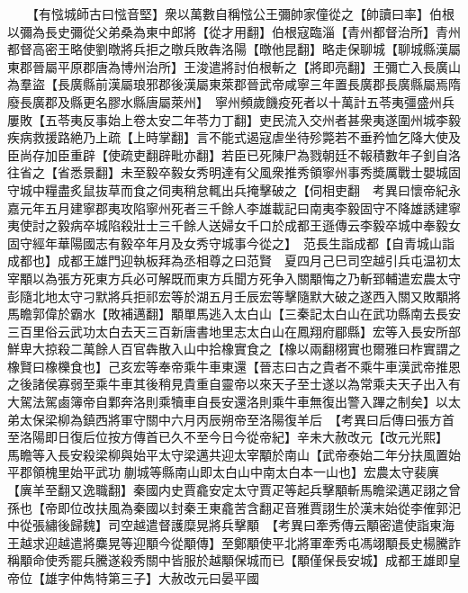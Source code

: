 　　【有惤城師古曰惤音堅】衆以萬數自稱惤公王彌帥家僮從之【帥讀曰率】伯根以彌為長史彌從父弟桑為東中郎將【從才用翻】伯根寇臨淄【青州都督治所】青州都督高密王略使劉暾將兵拒之暾兵敗犇洛陽【暾他昆翻】略走保聊城【聊城縣漢屬東郡晉屬平原郡唐為博州治所】王浚遣將討伯根斬之【將即亮翻】王彌亡入長廣山為羣盜【長廣縣前漢屬琅邪郡後漢屬東萊郡晉武帝咸寧三年置長廣郡長廣縣屬焉隋廢長廣郡及縣更名膠水縣唐屬萊州】　寧州頻歲饑疫死者以十萬計五苓夷彊盛州兵屢敗【五苓夷反事始上卷太安二年苓力丁翻】吏民流入交州者甚衆夷遂圍州城李毅疾病救援路絶乃上疏【上時掌翻】言不能式遏寇虐坐待殄斃若不垂矜恤乞降大使及臣尚存加臣重辟【使疏吏翻辟毗亦翻】若臣已死陳尸為戮朝廷不報積數年子釗自洛往省之【省悉景翻】未至毅卒毅女秀明達有父風衆推秀領寧州事秀奬厲戰士嬰城固守城中糧盡炙鼠抜草而食之伺夷稍怠輒出兵掩擊破之【伺相吏翻　考異曰懷帝紀永嘉元年五月建寧郡夷攻陷寧州死者三千餘人李雄載記曰南夷李毅固守不降雄誘建寧夷使討之毅病卒城陷殺壯士三千餘人送婦女千口於成都王遜傳云李毅卒城中奉毅女固守經年華陽國志有毅卒年月及女秀守城事今從之】　范長生詣成都【自青城山詣成都也】成都王雄門迎執板拜為丞相尊之曰范賢　夏四月己巳司空越引兵屯温初太宰顒以為張方死東方兵必可解既而東方兵聞方死争入關顒悔之乃斬郅輔遣宏農太守彭隨北地太守刁默將兵拒祁宏等於湖五月壬辰宏等擊隨默大破之遂西入關又敗顒將馬瞻郭偉於霸水【敗補邁翻】顒單馬逃入太白山【三秦記太白山在武功縣南去長安三百里俗云武功太白去天三百新唐書地里志太白山在鳳翔府郿縣】宏等入長安所部鮮卑大掠殺二萬餘人百官犇散入山中拾橡實食之【橡以兩翻栩實也爾雅曰柞實謂之橡賢曰橡櫟食也】己亥宏等奉帝乘牛車東還【晉志曰古之貴者不乘牛車漢武帝推恩之後諸侯寡弱至乘牛車其後稍見貴重自靈帝以來天子至士遂以為常乘夫天子出入有大駕法駕鹵簿帝自鄴奔洛則乘犢車自長安還洛則乘牛車無復出警入蹕之制矣】以太弟太保梁柳為鎮西將軍守關中六月丙辰朔帝至洛陽復羊后　【考異曰后傳曰張方首至洛陽即日復后位按方傳首已久不至今日今從帝紀】辛未大赦改元【改元光熙】　馬瞻等入長安殺梁柳與始平太守梁邁共迎太宰顒於南山【武帝泰始二年分扶風置始平郡領槐里始平武功蒯城等縣南山即太白山中南太白本一山也】宏農太守裴廙【廙羊至翻又逸職翻】秦國内史賈龕安定太守賈疋等起兵擊顒斬馬瞻梁邁疋詡之曾孫也【帝即位改扶風為秦國以封秦王東龕苦含翻疋音雅賈詡生於漢末始從李傕郭汜中從張繡後歸魏】司空越遣督護糜晃將兵擊顒　【考異曰牽秀傳云顒密遣使詣東海王越求迎越遣將麋晃等迎顒今從顒傳】至鄭顒使平北將軍牽秀屯馮翊顒長史楊騰詐稱顒命使秀罷兵騰遂殺秀關中皆服於越顒保城而已【顒僅保長安城】成都王雄即皇帝位【雄字仲雋特第三子】大赦改元曰晏平國

